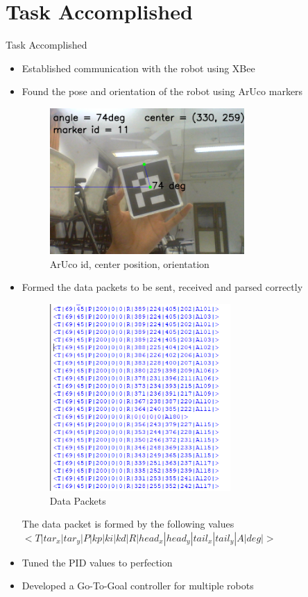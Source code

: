 \documentclass[10pt,a4paper]{beamer}
\begin{document}
\section{Task Accomplished}
\begin{frame}[allowframebreaks]{Task Accomplished}
\begin{itemize}
\item Established communication with the robot using XBee
\item Found the pose and orientation of the robot using ArUco markers
\begin{figure}
\includegraphics[height=0.6\textheight, width=0.7\textwidth]{image_screenshot2.png}\caption{ArUco id, center position, orientation}
\end{figure}
\item Formed the data packets to be sent, received and parsed correctly
\begin{figure}
\includegraphics[height=0.45\textheight, width=0.65\textwidth]{capture.png}\caption{Data Packets}
\end{figure}
\small{The data packet is formed by the following values}
\small{$<T|tar_x|tar_y|P|kp|ki|kd|R|head_x|head_y|tail_x|tail_y|A|deg|>$}
\item Tuned the PID values to perfection
\item Developed a Go-To-Goal controller for multiple robots
\end{itemize}
\end{frame}
\end{document}
